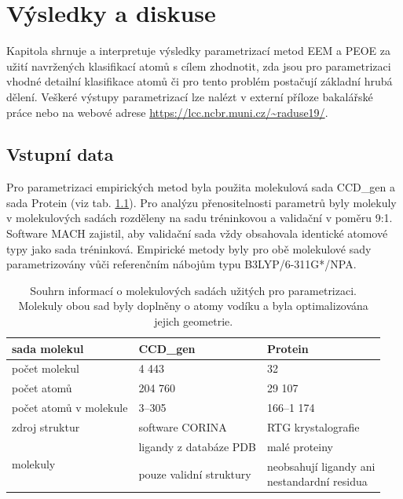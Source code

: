 \chapter{Výsledky a diskuse}
Kapitola shrnuje a interpretuje výsledky parametrizací metod EEM a PEOE za užití navržených klasifikací atomů s cílem zhodnotit, zda jsou pro parametrizaci vhodné detailní klasifikace atomů či pro tento problém postačují základní hrubá dělení. Veškeré výstupy parametrizací lze nalézt v externí příloze bakalářské práce nebo na webové adrese \url{https://lcc.ncbr.muni.cz/~raduse19/}.  

\section{Vstupní data}
Pro parametrizaci empirických metod byla použita molekulová sada CCD\_gen a sada Protein (viz tab. \ref{moleculesets}). Pro analýzu přenositelnosti parametrů byly molekuly v molekulových sadách rozděleny na sadu tréninkovou a validační v poměru 9:1. Software MACH zajistil, aby validační sada vždy obsahovala identické atomové typy jako sada tréninková. Empirické metody byly pro obě molekulové sady parametrizovány vůči referenčním nábojům typu B3LYP/6-311G*/NPA.
\begin{table}[h]
    \renewcommand{\arraystretch}{1.35}
    \centering
    \begin{tabular}{l|l|l}
         sada molekul &  \textbf{CCD\_gen} \cite{krab1k}
         & \textbf{Protein}\\
         \hline
         počet molekul & 4 443 & 32\\
         počet atomů & 204 760 & 29 107\\
         počet atomů v molekule & 3–305 & 166–1 174 \\
         zdroj struktur & software CORINA & RTG krystalografie \\
         \hline
         \multirow{2}{8em}{molekuly} & 
            ligandy z databáze PDB & malé proteiny\\
         & pouze validní struktury & \makecell[l]{neobsahují ligandy ani \\nestandardní residua}
    \end{tabular}
    \caption{Souhrn informací o molekulových sadách užitých pro parametrizaci. Molekuly obou sad 
    byly doplněny o atomy vodíku a byla optimalizována jejich geometrie.}
    \label{moleculesets}
\end{table}

